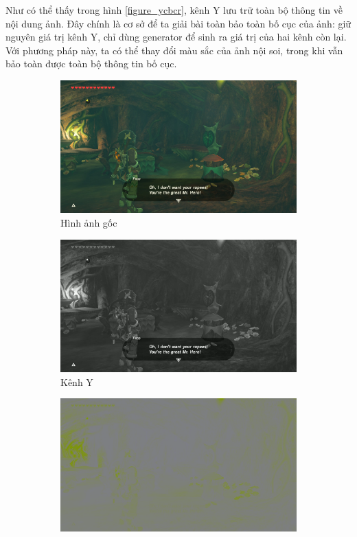 \documentclass[12pt]{extreport}
\begin{document}
Như có thể thấy trong hình \ref{figure_ycbcr}, kênh Y lưu trữ toàn bộ thông tin về nội dung ảnh. Đây chính là cơ sở để ta giải bài toàn bảo toàn bố cục của ảnh: giữ nguyên giá trị kênh Y, chỉ dùng generator để sinh ra giá trị của hai kênh còn lại. Với phương pháp này, ta có thể thay đổi màu sắc của ảnh nội soi, trong khi vẫn bảo toàn được toàn bộ thông tin bố cục.

\begin{figure}[H]
    \centering
    \begin{subfigure}[H]{\textwidth}
        \centering
        \includegraphics[width=0.3\linewidth]{figure29.jpg}
        \caption{Hình ảnh gốc}
    \end{subfigure}
    \begin{subfigure}[H]{0.3\textwidth}
        \centering
        \includegraphics[width=\linewidth]{figure30.png}
        \caption{Kênh Y}
    \end{subfigure}
    \begin{subfigure}[H]{0.3\textwidth}
        \centering
        \includegraphics[width=\linewidth]{figure31.png}

\end{subfigure}
\end{figure}
\end{document}
